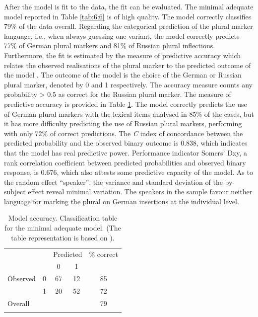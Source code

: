 After the model is fit to the data, the fit can be evaluated. The minimal adequate model reported in Table \ref{tab:6:6} is of high quality. The model correctly classifies 79\% of the data overall. Regarding the categorical prediction of the plural marker language, i.e., when always guessing one variant, the model correctly predicts 77\% of German plural markers and 81\% of Russian plural inflections. Furthermore, the fit is estimated by the measure of predictive accuracy which relates the observed realisations of the plural marker to the predicted outcome of the model \citep{bresnan-etal}. The outcome of the model is the choice of the German or Russian plural marker, denoted by 0 and 1 respectively. The accuracy measure counts any probability >{} 0.5 as correct for the Russian plural marker. The measure of predictive accuracy is provided in Table \ref{tab:6:7}. The model correctly predicts the use of German plural markers with the lexical items analysed in 85\% of the cases, but it has more difficulty predicting the use of Russian plural markers, performing with only 72\% of correct predictions. The \textit{C} index of concordance between the predicted probability and the observed binary outcome is 0.838, which indicates that the model has real predictive power. Performance indicator Somers' Dxy, a rank correlation coefficient between predicted probabilities and observed binary response, is 0.676, which also attests some predictive capacity of the model. As to the random effect “speaker”, the variance and standard deviation of the by-subject effect reveal minimal variation. The speakers in the sample favour neither language for marking the plural on German insertions at the individual level.

\begin{table}
		\begin{tabular}{l cccc} 
		\lsptoprule
 			&& \multicolumn{2}{c}{Predicted} &\% correct\\\cmidrule(lr){3-4}
			  & &0 &1 &\\ \midrule
			Observed  & 0     &67   &12 &85\\
			 &1 &20 &52 &72\\
			 Overall & & & &79\\
			 \lspbottomrule
		 \end{tabular}
		 \caption{Model accuracy. Classification table for the minimal adequate model. (The table representation is based on \citealt{bresnan-etal}).\label{tab:6:7}}
\end{table}

